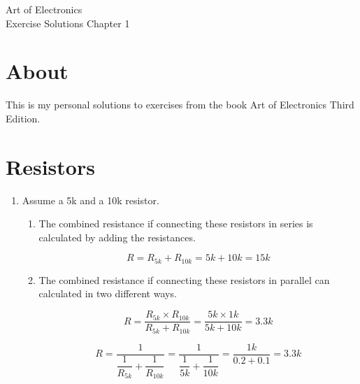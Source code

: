 \documentclass[]{article}
\begin{document}
\begingroup  
	\raggedright
	\LARGE Art of Electronics\\
	\LARGE Exercise Solutions Chapter 1\\
\endgroup
	
\section*{About}
	This is my personal solutions to exercises from the book Art of Electronics Third Edition. 

\section*{Resistors}

\begin{enumerate}
	
	\item Assume a 5k and a 10k resistor.
	
	\begin{enumerate}
		
		\item The combined resistance if connecting these resistors in series is calculated by adding the resistances.
		
		\begin{equation*}
		R = R_{5k} + R_{10k} = 5k + 10k = 15k
		\end{equation*}
		
		\item The combined resistance if connecting these resistors in parallel can calculated in two different ways.
		
		\begin{equation*}
				R = \dfrac{ R_{5k} \times R_{10k} }{ R_{5k} + R_{10k} } = \dfrac{ 5k \times 1k }{ 5k + 10k } = 3.3k
		\end{equation*}
		
		\begin{equation*}
				R = \dfrac{ 1 }{ \dfrac{ 1 }{ R_{5k} } + \dfrac { 1 } { R_{10k} } }
				= \dfrac{ 1 }{ \dfrac{ 1 }{ 5k } + \dfrac { 1 } { 10k } } 
				= \dfrac {1k}{0.2 + 0.1}= 3.3k
		\end{equation*}
		
		
	
	
	\end{enumerate}
		
\end{enumerate}
	
\end{document}

